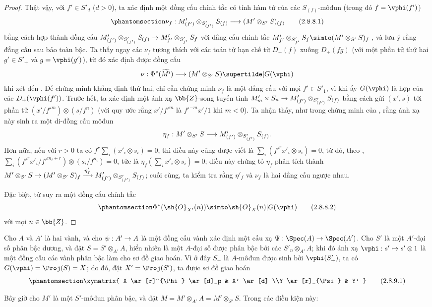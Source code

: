 \documentclass[oneside,10pt]{amsart}
\makeatletter
\newcommand{\ega@arrow}[2]{\mathchoice{#1}{#2}{#2}{#2}}
\let\ega@shortmapsto\mapsto
\renewcommand{\to}{\ega@arrow{\longrightarrow}{\rightarrow}}
\renewcommand{\mapsto}{\ega@arrow{\longmapsto}{\ega@shortmapsto}}
\newcommand{\oldpage}[2][]{\marginnote{\normalfont\footnotesize\textbf{#1}~|~#2}\ignorespaces}
\let\EGAOriginalLabel\label
\renewcommand{\label}[1]{\phantomsection\EGAOriginalLabel{#1}}
\makeatother
\begin{document}
\begin{proof}
Thật vậy, với $f'\in S'_d$ ($d>0$), ta xác định một đồng cấu chính tắc có tính hàm tử của các $S_{(f)}$-môđun (trong đó $f=\vphi(f')$)
\[
\label{II.2.8.8.1}
  \nu_f:M'_{(f')}\otimes_{S'_{(f')}}S_{(f)}\to(M'\otimes_{S'}S)_{(f)}
\tag{2.8.8.1}
\]
bằng cách hợp thành đồng cấu $M'_{(f')}\otimes_{S'_{(f')}}S_{(f)}\to M'_{f'}\otimes_{S'_{f'}}S_f$ với đẳng cấu chính tắc $M'_{f'}\otimes_{S'_{f'}}S_f\simto(M'\otimes_{S'}S)_f$ , và lưu ý rằng đẳng cấu sau bảo toàn bậc.
Ta thấy ngay các $\nu_f$ tương thích với các toán tử hạn chế từ $D_+(f)$ xuống $D_+(fg)$ (với một phần tử thứ hai $g'\in S'_+$ và $g=\vphi(g')$), từ đó xác định được đồng cấu
\[
  \nu:\Phi^*(\widetilde{M'})\to(M'\otimes_{S'}S)\supertilde|G(\vphi)
\]
khi xét đến .
Để chứng minh khẳng định thứ hai, chỉ cần chứng minh $\nu_f$ là một đẳng cấu với mọi $f'\in S'_1$, vì khi ấy $G(\vphi)$ là hợp của các $D_+(\vphi(f'))$.
Trước hết, ta xác định một ánh xạ $\bb{Z}$-song tuyến tính $M'_m\times S_n\to M'_{(f')}\otimes_{S'_{(f')}}S_{(f)}$ bằng cách gửi $(x',s)$ tới phần tử $(x'/{f'}^m)\otimes(s/f^n)$ (với quy ước rằng $x'/{f'}^m$ là ${f'}^{-m}x'/1$
\oldpage[II]{45}
khi $m<0$).
Ta nhận thấy, như trong chứng minh của , rằng ánh xạ này sinh ra một di-đồng cấu môđun
\[
  \eta_f: M'\otimes_{S'}S \to M'_{(f')}\otimes_{S'_{(f')}}S_{(f)}.
\]
Hơn nữa, nếu với $r>0$ ta có $f^r\sum_i(x'_i\otimes s_i)=0$, thì điều này cũng được viết là $\sum_i({f'}^rx'_i\otimes s_i)=0$, từ đó, theo , $\sum_i({f'}^rx'_i/{f'}^{m_i+r})\otimes(s_i/f^{n_i})=0$, tức là $\eta_f(\sum_i x'_i\otimes s_i)=0$; điều này chứng tỏ $\eta_f$ phân tích thành $M'\otimes_{S'}S\to(M'\otimes_{S'}S)_f\xrightarrow{\eta'_f}M'_{(f')}\otimes_{S'_{(f')}}S_{(f)}$;
cuối cùng, ta kiểm tra rằng $\eta'_f$ và $\nu_f$ là hai đẳng cấu ngược nhau.

Đặc biệt, từ  suy ra một đồng cấu chính tắc
\[
\label{II.2.8.8.2}
  \Phi^*(\sh{O}_{X'}(n)) \simto \sh{O}_X(n)|G(\vphi)
\tag{2.8.8.2}
\]
với mọi $n\in\bb{Z}$.
\end{proof}

\begin{env}[2.8.9]
\label{II.2.8.9}
Cho $A$ và $A'$ là hai vành, và cho $\psi:A'\to A$ là một đồng cấu vành xác định một cấu xạ $\Psi:\Spec(A)\to\Spec(A')$.
Cho $S'$ là một $A'$-đại số phân bậc dương, và đặt $S=S'\otimes_{A'}A$, hiển nhiên là một $A$-đại số được phân bậc bởi các $S'_n\otimes_{A'}A$;
khi đó ánh xạ $\vphi:s'\mapsto s'\otimes1$ là một đồng cấu các vành phân bậc làm cho sơ đồ  giao hoán.
Vì ở đây $S_+$ là $A$-môđun được sinh bởi $\vphi(S'_+)$, ta có $G(\vphi)=\Proj(S)=X$;
do đó, đặt $X'=\Proj(S')$, ta được sơ đồ giao hoán
\[
\label{II.2.8.9.1}
  \xymatrix{
    X \ar[r]^{\Phi} \ar[d]_p
    & X' \ar[d]
  \\Y \ar[r]_{\Psi}
    & Y'
  }
\tag{2.8.9.1}
\]

Bây giờ cho $M'$ là một $S'$-môđun phân bậc, và đặt $M=M'\otimes_{A'}A=M'\otimes_{S'}S$.
Trong các điều kiện này:
\end{env}
\end{document}
